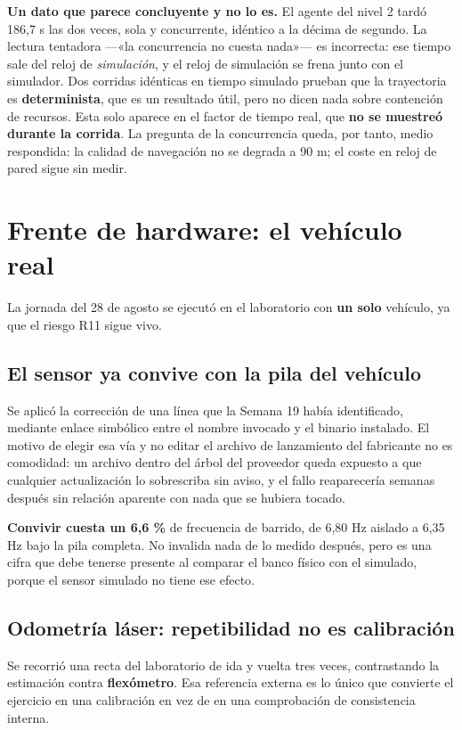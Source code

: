 \documentclass[12pt,letterpaper]{article}
\begin{document}
\textbf{Un dato que parece concluyente y no lo es.} El agente del nivel 2 tardó 186,7 s las dos veces, sola y concurrente, idéntico a la décima de segundo. La lectura tentadora ---«la concurrencia no cuesta nada»--- es incorrecta: ese tiempo sale del reloj de \emph{simulación}, y el reloj de simulación se frena junto con el simulador. Dos corridas idénticas en tiempo simulado prueban que la trayectoria es \textbf{determinista}, que es un resultado útil, pero no dicen nada sobre contención de recursos. Esta solo aparece en el factor de tiempo real, que \textbf{no se muestreó durante la corrida}. La pregunta de la concurrencia queda, por tanto, medio respondida: la calidad de navegación no se degrada a 90 m; el coste en reloj de pared sigue sin medir.

\section{Frente de hardware: el vehículo real}
\label{sec:hardware}

La jornada del 28 de agosto se ejecutó en el laboratorio con \textbf{un solo} vehículo, ya que el riesgo R11 sigue vivo.

\subsection{El sensor ya convive con la pila del vehículo}

Se aplicó la corrección de una línea que la Semana 19 había identificado, mediante enlace simbólico entre el nombre invocado y el binario instalado. El motivo de elegir esa vía y no editar el archivo de lanzamiento del fabricante no es comodidad: un archivo dentro del árbol del proveedor queda expuesto a que cualquier actualización lo sobrescriba sin aviso, y el fallo reaparecería semanas después sin relación aparente con nada que se hubiera tocado.

\textbf{Convivir cuesta un 6,6 \%} de frecuencia de barrido, de 6,80 Hz aislado a 6,35 Hz bajo la pila completa. No invalida nada de lo medido después, pero es una cifra que debe tenerse presente al comparar el banco físico con el simulado, porque el sensor simulado no tiene ese efecto.

\subsection{Odometría láser: repetibilidad no es calibración}

Se recorrió una recta del laboratorio de ida y vuelta tres veces, contrastando la estimación contra \textbf{flexómetro}. Esa referencia externa es lo único que convierte el ejercicio en una calibración en vez de en una comprobación de consistencia interna.
\end{document}

